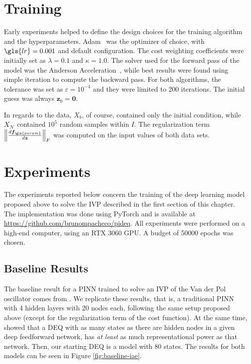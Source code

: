 \section{Training}

Early experiments helped to define the design choices for the training algorithm and the hyperparameters.
Adam~\cite{kingma_adam_2015} was the optimizer of choice, with $\gls{lr}=0.001$ and default configuration.
The cost weighting coefficients were initially set as $\lambda=0.1$ and $\kappa=1.0$.
The solver used for the forward pass of the model was the Anderson Acceleration~\cite{walker_anderson_2011}, while best results were found using simple iteration to compute the backward pass.
For both algorithms, the tolerance was set as $\varepsilon=10^{-4}$ and they were limited to 200 iterations.
The initial guess was always $\bm{z}_0=\bm{0}$.

In regards to the data, $X_b$, of course, contained only the initial condition, while $X_{\mathcal{N}}$ contained $10^5$ random samples within $I$.
The regularization term $\left\lVert \frac{d \bm{f}_{\gls{param}}}{d \bm{z}}\right\rVert_F$ was computed on the input values of both data sets.

\section{Experiments}

The experiments reported below concern the training of the deep learning model proposed above to solve the \gls{IVP} described in the first section of this chapter.
The implementation was done using PyTorch \cite{paszke_pytorch_2019} and is available at \url{https://github.com/brunompacheco/pideq}.
All experiments were performed on a high-end computer, using an RTX 3060 GPU.
A budget of 50000 epochs was chosen.

\subsection{Baseline Results}

The baseline result for a \gls{PINN} trained to solve an \gls{IVP} of the Van der Pol oscillator comes from \textcite{Antonelo2021}.
We replicate these results, that is, a traditional \gls{PINN} with 4 hidden layers with 20 nodes each, following the same setup proposed above (except for the regularization term of the cost function).
At the same time, \textcite{Ghaoui2019} showed that a \gls{DEQ} with as many states as there are hidden nodes in a given deep feedforward network, has \emph{at least} as much representational power as that network.
Then, our starting \gls{DEQ} is a model with 80 states.
The results for both models can be seen in Figure \ref{fig:baseline-iae}.

